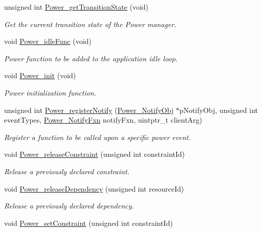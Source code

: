 \begin{DoxyCompactItemize}
unsigned int \hyperlink{_power_8h_a6be3927156b139cf59cd4bec912f62f6}{Power\+\_\+get\+Transition\+State} (void)
\begin{DoxyCompactList}\small\item\em Get the current transition state of the Power manager. \end{DoxyCompactList}\item 
void \hyperlink{_power_8h_a873219012923300f3b3b958b951a4ea1}{Power\+\_\+idle\+Func} (void)
\begin{DoxyCompactList}\small\item\em Power function to be added to the application idle loop. \end{DoxyCompactList}\item 
void \hyperlink{_power_8h_ac778e1f0fbf930a8dabd35fe0a49cb8d}{Power\+\_\+init} (void)
\begin{DoxyCompactList}\small\item\em Power initialization function. \end{DoxyCompactList}\item 
unsigned int \hyperlink{_power_8h_a8e73c431e3d1aab1a31181513ceb8adb}{Power\+\_\+register\+Notify} (\hyperlink{struct_power___notify_obj}{Power\+\_\+\+Notify\+Obj} $\ast$p\+Notify\+Obj, unsigned int event\+Types, \hyperlink{_power_8h_a91335240b2081eeefec80d043030c857}{Power\+\_\+\+Notify\+Fxn} notify\+Fxn, uintptr\+\_\+t client\+Arg)
\begin{DoxyCompactList}\small\item\em Register a function to be called upon a specific power event. \end{DoxyCompactList}\item 
void \hyperlink{_power_8h_a51ac80ce389379e25ad94347d567ea1f}{Power\+\_\+release\+Constraint} (unsigned int constraint\+Id)
\begin{DoxyCompactList}\small\item\em Release a previously declared constraint. \end{DoxyCompactList}\item 
void \hyperlink{_power_8h_a5ff8c1b6df212c2ff41c5e38b4d4a9cd}{Power\+\_\+release\+Dependency} (unsigned int resource\+Id)
\begin{DoxyCompactList}\small\item\em Release a previously declared dependency. \end{DoxyCompactList}\item 
void \hyperlink{_power_8h_a8533319df1b463beddc5b910241fde7d}{Power\+\_\+set\+Constraint} (unsigned int constraint\+Id)

\end{DoxyCompactItemize}
